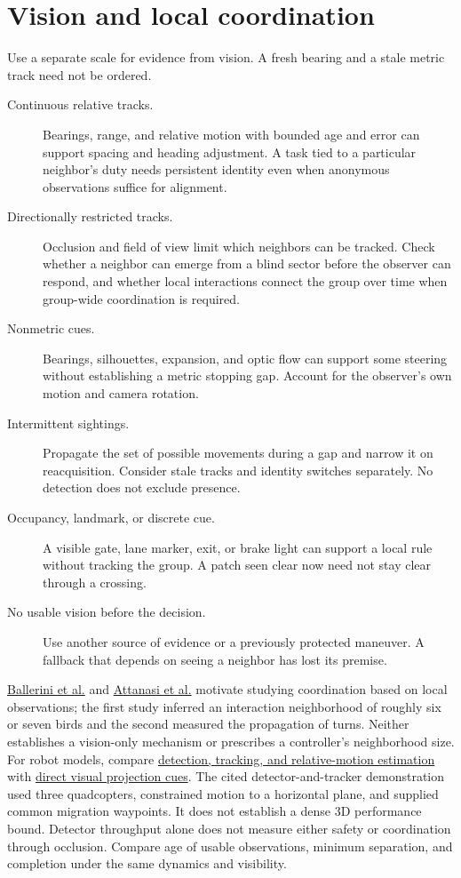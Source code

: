 \documentclass[11pt]{article}
\begin{document}
\section{Vision and local coordination}
Use a separate scale for evidence from vision. A fresh bearing and a stale metric track need not be ordered.
\begin{description}
\item[Continuous relative tracks.] Bearings, range, and relative motion with bounded age and error can support spacing and heading adjustment. A task tied to a particular neighbor's duty needs persistent identity even when anonymous observations suffice for alignment.
\item[Directionally restricted tracks.] Occlusion and field of view limit which neighbors can be tracked. Check whether a neighbor can emerge from a blind sector before the observer can respond, and whether local interactions connect the group over time when group-wide coordination is required.
\item[Nonmetric cues.] Bearings, silhouettes, expansion, and optic flow can support some steering without establishing a metric stopping gap. Account for the observer's own motion and camera rotation.
\item[Intermittent sightings.] Propagate the set of possible movements during a gap and narrow it on reacquisition. Consider stale tracks and identity switches separately. No detection does not exclude presence.
\item[Occupancy, landmark, or discrete cue.] A visible gate, lane marker, exit, or brake light can support a local rule without tracking the group. A patch seen clear now need not stay clear through a crossing.
\item[No usable vision before the decision.] Use another source of evidence or a previously protected maneuver. A fallback that depends on seeing a neighbor has lost its premise.
\end{description}

\href{https://pmc.ncbi.nlm.nih.gov/articles/PMC2234121/}{Ballerini et al.} and \href{https://www.nature.com/articles/nphys3035}{Attanasi et al.} motivate studying coordination based on local observations; the first study inferred an interaction neighborhood of roughly six or seven birds and the second measured the propagation of turns. Neither establishes a vision-only mechanism or prescribes a controller's neighborhood size. For robot models, compare \href{https://arxiv.org/abs/2012.01245}{detection, tracking, and relative-motion estimation} with \href{https://www.nature.com/articles/s44182-025-00027-2}{direct visual projection cues}. The cited detector-and-tracker demonstration used three quadcopters, constrained motion to a horizontal plane, and supplied common migration waypoints. It does not establish a dense 3D performance bound. Detector throughput alone does not measure either safety or coordination through occlusion. Compare age of usable observations, minimum separation, and completion under the same dynamics and visibility.
\end{document}
